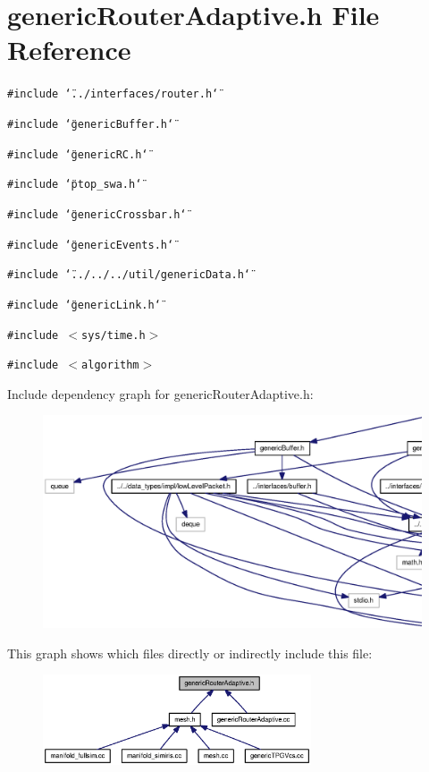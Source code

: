 \section{genericRouterAdaptive.h File Reference}
\label{genericRouterAdaptive_8h}
{\tt \#include \char`\"{}../interfaces/router.h\char`\"{}}\par
{\tt \#include \char`\"{}genericBuffer.h\char`\"{}}\par
{\tt \#include \char`\"{}genericRC.h\char`\"{}}\par
{\tt \#include \char`\"{}ptop\_\-swa.h\char`\"{}}\par
{\tt \#include \char`\"{}genericCrossbar.h\char`\"{}}\par
{\tt \#include \char`\"{}genericEvents.h\char`\"{}}\par
{\tt \#include \char`\"{}../../../util/genericData.h\char`\"{}}\par
{\tt \#include \char`\"{}genericLink.h\char`\"{}}\par
{\tt \#include $<$sys/time.h$>$}\par
{\tt \#include $<$algorithm$>$}\par


Include dependency graph for genericRouterAdaptive.h:\nopagebreak
\begin{figure}[H]
\begin{center}
\leavevmode
\includegraphics[width=420pt]{genericRouterAdaptive_8h__incl}
\end{center}
\end{figure}


This graph shows which files directly or indirectly include this file:\nopagebreak
\begin{figure}[H]
\begin{center}
\leavevmode
\includegraphics[width=225pt]{genericRouterAdaptive_8h__dep__incl}
\end{center}
\end{figure}
